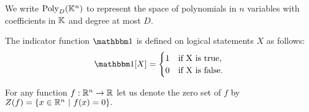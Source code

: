 We write $\text{Poly}_D (\mathbb K^n)$ to represent the space of polynomials in $n$ variables with coefficients in $\mathbb K$ and degree at most $D$.

The indicator function $\OO$ is defined on logical statements $X$ as follows:
\[
    \OO[X] = 
  \begin{cases}
      1 & \text{if X is true}, \\
      0 & \text{if X is false}.
  \end{cases}  
\]

For any function $f : \mathbb R^n \to \mathbb R$ let us denote the zero set of $f$ by $Z(f) = \{x \in \mathbb R^n \ | \ f(x) = 0\}.$
